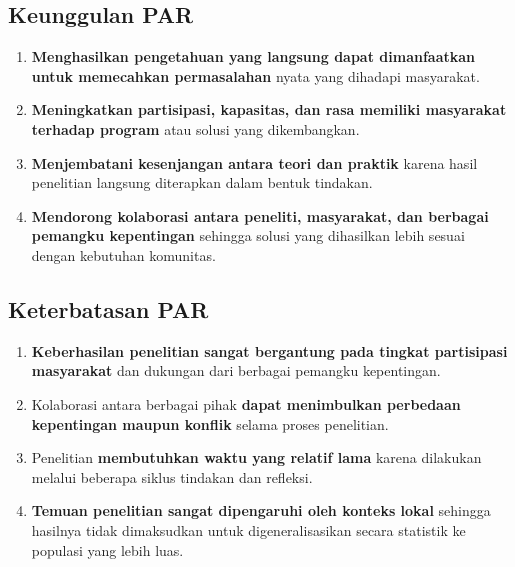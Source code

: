 \documentclass[
  indonesian,
  letterpaper,
  DIV=11,
  numbers=noendperiod]{scrreprt}
\providecommand{\tightlist}{%
  \setlength{\itemsep}{0pt}\setlength{\parskip}{0pt}}
\begin{document}
\subsection{Keunggulan PAR}\label{keunggulan-par}

\begin{enumerate}
\def\labelenumi{\arabic{enumi}.}
\tightlist
\item
  \textbf{Menghasilkan pengetahuan yang langsung dapat dimanfaatkan
  untuk memecahkan permasalahan} nyata yang dihadapi masyarakat.
\item
  \textbf{Meningkatkan partisipasi, kapasitas, dan rasa memiliki
  masyarakat terhadap program} atau solusi yang dikembangkan.
\item
  \textbf{Menjembatani kesenjangan antara teori dan praktik} karena
  hasil penelitian langsung diterapkan dalam bentuk tindakan.
\item
  \textbf{Mendorong kolaborasi antara peneliti, masyarakat, dan berbagai
  pemangku kepentingan} sehingga solusi yang dihasilkan lebih sesuai
  dengan kebutuhan komunitas.
\end{enumerate}

\subsection{Keterbatasan PAR}\label{keterbatasan-par}

\begin{enumerate}
\def\labelenumi{\arabic{enumi}.}
\tightlist
\item
  \textbf{Keberhasilan penelitian sangat bergantung pada tingkat
  partisipasi masyarakat} dan dukungan dari berbagai pemangku
  kepentingan.
\item
  Kolaborasi antara berbagai pihak \textbf{dapat menimbulkan perbedaan
  kepentingan maupun konflik} selama proses penelitian.
\item
  Penelitian \textbf{membutuhkan waktu yang relatif lama} karena
  dilakukan melalui beberapa siklus tindakan dan refleksi.
\item
  \textbf{Temuan penelitian sangat dipengaruhi oleh konteks lokal}
  sehingga hasilnya tidak dimaksudkan untuk digeneralisasikan secara
  statistik ke populasi yang lebih luas.
\end{enumerate}
\end{document}
